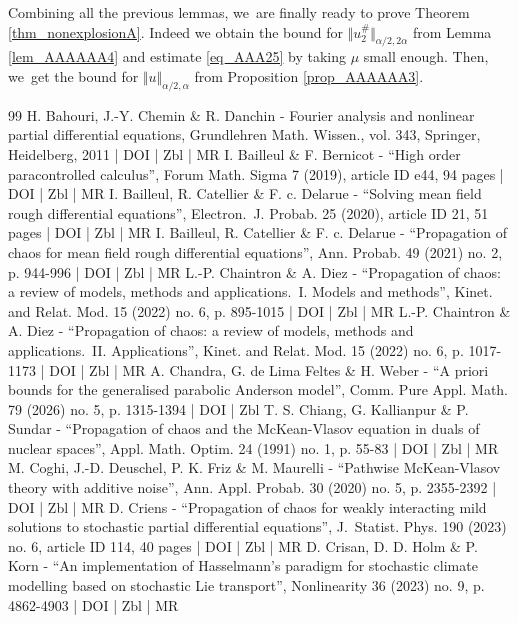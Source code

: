 \documentclass[10pt]{amsart}
\theoremstyle{definition}
\newcommand{\norme}[1]{\Vert #1 \Vert}
\begin{document}
Combining all the previous lemmas, we~are finally ready to prove Theorem \ref{thm_nonexplosionA}. Indeed we obtain the bound for $\norme{u_2^\#}_{\alpha/2,2\alpha}$ from Lemma \ref{lem_AAAAAA4} and estimate \eqref{eq_AAA25} by taking $\mu$ small enough. Then, we~get the bound for $\norme{u}_{\alpha/2,\alpha}$ from Proposition \ref{prop_AAAAAA3}.



\begin{thebibliography}{99}
H. Bahouri, J.-Y. Chemin \& R. Danchin - Fourier analysis and nonlinear partial differential equations, Grundlehren Math. Wissen., vol. 343, Springer, Heidelberg, 2011 | DOI | Zbl | MR
I. Bailleul \& F. Bernicot - “High order paracontrolled calculus”, Forum Math. Sigma 7 (2019), article ID e44, 94 pages | DOI | Zbl | MR
I. Bailleul, R. Catellier \& F. c. Delarue - “Solving mean field rough differential equations”, Electron. J. Probab. 25 (2020), article ID 21, 51 pages | DOI | Zbl | MR
I. Bailleul, R. Catellier \& F. c. Delarue - “Propagation of chaos for mean field rough differential equations”, Ann. Probab. 49 (2021) no. 2, p. 944-996 | DOI | Zbl | MR
L.-P. Chaintron \& A. Diez - “Propagation of chaos: a review of models, methods and applications. I. Models and methods”, Kinet. and Relat. Mod. 15 (2022) no. 6, p. 895-1015 | DOI | Zbl | MR
L.-P. Chaintron \& A. Diez - “Propagation of chaos: a review of models, methods and applications. II. Applications”, Kinet. and Relat. Mod. 15 (2022) no. 6, p. 1017-1173 | DOI | Zbl | MR
A. Chandra, G. de Lima Feltes \& H. Weber - “A priori bounds for the generalised parabolic Anderson model”, Comm. Pure Appl. Math. 79 (2026) no. 5, p. 1315-1394 | DOI | Zbl
T. S. Chiang, G. Kallianpur \& P. Sundar - “Propagation of chaos and the McKean-Vlasov equation in duals of nuclear spaces”, Appl. Math. Optim. 24 (1991) no. 1, p. 55-83 | DOI | Zbl | MR
M. Coghi, J.-D. Deuschel, P. K. Friz \& M. Maurelli - “Pathwise McKean-Vlasov theory with additive noise”, Ann. Appl. Probab. 30 (2020) no. 5, p. 2355-2392 | DOI | Zbl | MR
D. Criens - “Propagation of chaos for weakly interacting mild solutions to stochastic partial differential equations”, J. Statist. Phys. 190 (2023) no. 6, article ID 114, 40 pages | DOI | Zbl | MR
D. Crisan, D. D. Holm \& P. Korn - “An implementation of Hasselmann’s paradigm for stochastic climate modelling based on stochastic Lie transport”, Nonlinearity 36 (2023) no. 9, p. 4862-4903 | DOI | Zbl | MR

\end{thebibliography}
\end{document}
